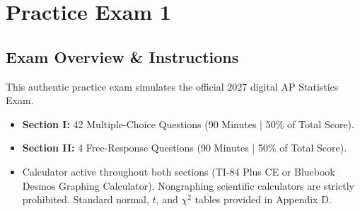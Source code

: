 \chapter{Practice Exam 1}

\section*{Exam Overview \& Instructions}
This authentic practice exam simulates the official 2027 digital AP Statistics Exam.
\begin{itemize}[leftmargin=1.2em]
  \item \textbf{Section I:} 42 Multiple-Choice Questions (90 Minutes | 50\% of Total Score).
  \item \textbf{Section II:} 4 Free-Response Questions (90 Minutes | 50\% of Total Score).
  \item Calculator active throughout both sections (TI-84 Plus CE or Bluebook Desmos Graphing Calculator). Nongraphing scientific calculators are strictly prohibited. Standard normal, $t$, and $\chi^2$ tables provided in Appendix D.
\end{itemize}

